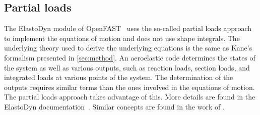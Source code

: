 \documentclass[wes, manuscript]{copernicus}
\renewcommand{\v}[1]{\boldsymbol{#1}}
\newcommand{\m}[1]{\boldsymbol{#1}}
\newcommand{\todoBoth}    [1]{{\colorbox{yellow}{TODO Both:    }}{\color{red}{#1}}\colorbox{yellow}{/}}
\begin{document}


\subsection{Partial loads}
\label{sec:PartialLoads}
The ElastoDyn module of OpenFAST~\citep{OpenFAST} uses the so-called partial loads approach to implement the equations of motion and does not use shape integrals.
The underlying theory used to derive the underlying equations is the same as Kane's formalism presented in \autoref{sec:method}.
An aeroelastic code determines the states of the system as well as various outputs, such as reaction loads, section loads, and integrated loads at various points of the system.
The determination of the outputs requires similar terms than the ones involved in the equations of motion. 
The partial loads approach takes advantage of this. More details are found in the ElastoDyn documentation~\citep{OpenFAST}. Similar concepts are found in the work of \citet{Blajer:2005AnAS}.







\end{document}
